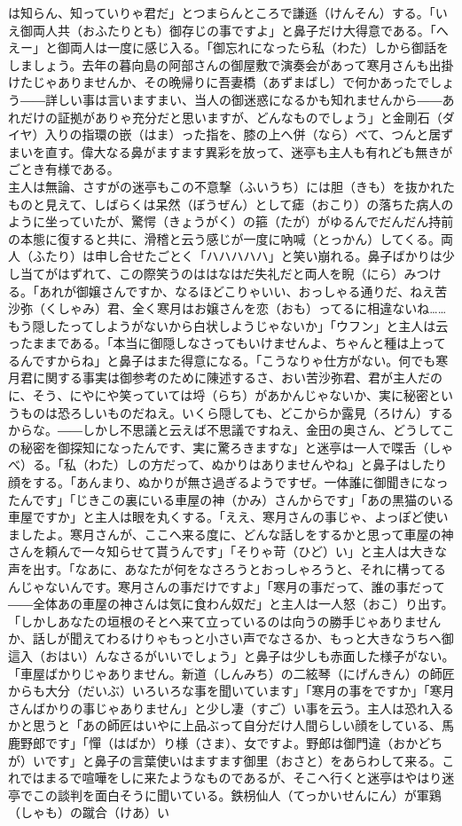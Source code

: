 \documentclass{book}
\begin{document}
は知らん、知っていりゃ君だ」とつまらんところで謙遜（けんそん）する。「いえ御両人共（おふたりとも）御存じの事ですよ」と鼻子だけ大得意である。「へえー」と御両人は一度に感じ入る。「御忘れになったら私（わた）しから御話をしましょう。去年の暮向島の阿部さんの御屋敷で演奏会があって寒月さんも出掛けたじゃありませんか、その晩帰りに吾妻橋（あずまばし）で何かあったでしょう――詳しい事は言いますまい、当人の御迷惑になるかも知れませんから――あれだけの証拠がありゃ充分だと思いますが、どんなものでしょう」と金剛石（ダイヤ）入りの指環の嵌（はま）った指を、膝の上へ併（なら）べて、つんと居ずまいを直す。偉大なる鼻がますます異彩を放って、迷亭も主人も有れども無きがごとき有様である。\\
主人は無論、さすがの迷亭もこの不意撃（ふいうち）には胆（きも）を抜かれたものと見えて、しばらくは呆然（ぼうぜん）として瘧（おこり）の落ちた病人のように坐っていたが、驚愕（きょうがく）の箍（たが）がゆるんでだんだん持前の本態に復すると共に、滑稽と云う感じが一度に吶喊（とっかん）してくる。両人（ふたり）は申し合せたごとく「ハハハハハ」と笑い崩れる。鼻子ばかりは少し当てがはずれて、この際笑うのははなはだ失礼だと両人を睨（にら）みつける。「あれが御嬢さんですか、なるほどこりゃいい、おっしゃる通りだ、ねえ苦沙弥（くしゃみ）君、全く寒月はお嬢さんを恋（おも）ってるに相違ないね\ldots{}\ldots{}もう隠したってしようがないから白状しようじゃないか」「ウフン」と主人は云ったままである。「本当に御隠しなさってもいけませんよ、ちゃんと種は上ってるんですからね」と鼻子はまた得意になる。「こうなりゃ仕方がない。何でも寒月君に関する事実は御参考のために陳述するさ、おい苦沙弥君、君が主人だのに、そう、にやにや笑っていては埒（らち）があかんじゃないか、実に秘密というものは恐ろしいものだねえ。いくら隠しても、どこからか露見（ろけん）するからな。――しかし不思議と云えば不思議ですねえ、金田の奥さん、どうしてこの秘密を御探知になったんです、実に驚ろきますな」と迷亭は一人で喋舌（しゃべ）る。「私（わた）しの方だって、ぬかりはありませんやね」と鼻子はしたり顔をする。「あんまり、ぬかりが無さ過ぎるようですぜ。一体誰に御聞きになったんです」「じきこの裏にいる車屋の神（かみ）さんからです」「あの黒猫のいる車屋ですか」と主人は眼を丸くする。「ええ、寒月さんの事じゃ、よっぽど使いましたよ。寒月さんが、ここへ来る度に、どんな話しをするかと思って車屋の神さんを頼んで一々知らせて貰うんです」「そりゃ苛（ひど）い」と主人は大きな声を出す。「なあに、あなたが何をなさろうとおっしゃろうと、それに構ってるんじゃないんです。寒月さんの事だけですよ」「寒月の事だって、誰の事だって――全体あの車屋の神さんは気に食わん奴だ」と主人は一人怒（おこ）り出す。「しかしあなたの垣根のそとへ来て立っているのは向うの勝手じゃありませんか、話しが聞えてわるけりゃもっと小さい声でなさるか、もっと大きなうちへ御這入（おはい）んなさるがいいでしょう」と鼻子は少しも赤面した様子がない。「車屋ばかりじゃありません。新道（しんみち）の二絃琴（にげんきん）の師匠からも大分（だいぶ）いろいろな事を聞いています」「寒月の事をですか」「寒月さんばかりの事じゃありません」と少し凄（すご）い事を云う。主人は恐れ入るかと思うと「あの師匠はいやに上品ぶって自分だけ人間らしい顔をしている、馬鹿野郎です」「憚（はばか）り様（さま）、女ですよ。野郎は御門違（おかどちが）いです」と鼻子の言葉使いはますます御里（おさと）をあらわして来る。これではまるで喧嘩をしに来たようなものであるが、そこへ行くと迷亭はやはり迷亭でこの談判を面白そうに聞いている。鉄枴仙人（てっかいせんにん）が軍鶏（しゃも）の蹴合（けあ）い
\end{document}
